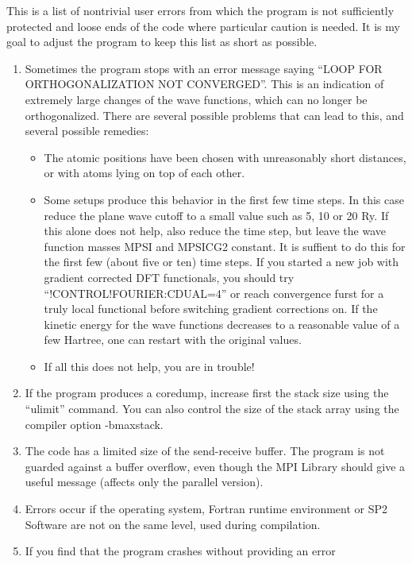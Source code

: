 \documentclass[final,12pt]{article}
\begin{document}
{{{{{{This is a list of nontrivial user errors from which the program is not
sufficiently protected and loose ends of the code where particular
caution is needed. It is my goal to adjust the program to
keep this list as short as possible.

\begin{enumerate}
\item Sometimes the program stops with an error message saying 
  ``LOOP FOR ORTHOGONALIZATION NOT CONVERGED''. This is an indication
  of extremely large changes of the wave functions, which can no
  longer be orthogonalized. There are several possible problems that can
  lead to this, and several possible remedies: 
  \begin{itemize}
  \item The atomic positions have been chosen with unreasonably short
    distances, or with atoms lying on top of each other.
  \item Some setups produce this behavior in the first few time steps.
    In this case reduce the plane wave cutoff to a small value such as
    5, 10 or 20 Ry. If this alone does not help, also reduce the time
    step, but leave the wave function masses MPSI and MPSICG2
    constant. It is suffient to do this for the first few (about five
    or ten) time steps. If you started a new job with gradient
    corrected DFT functionals, you should try
    ``!CONTROL!FOURIER:CDUAL=4'' or reach convergence furst for a
    truly local functional before switching gradient corrections
    on. If the kinetic energy for the wave functions decreases to a
    reasonable value of a few Hartree, one can restart with the
    original values.
  \item If all this does not help, you are in trouble!
  \end{itemize}
\item If the program produces a coredump, increase first the stack size
  using the ``ulimit'' command. You can also control the size of the stack
  array using the compiler option -bmaxstack.
\item The code has a limited size of the send-receive buffer. The
  program is not guarded against a buffer overflow, even though the MPI
  Library should give a useful message (affects only the parallel
  version).
\item Errors occur if the operating system, Fortran runtime
  environment or SP2 Software are not on the same level, 
  used during compilation.
\item If you find that the program crashes without providing an error

\end{enumerate}}}}}}}
\end{document}
